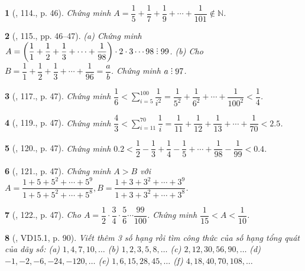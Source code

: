 \documentclass{article}
\newtheorem{baitoan}{}
\DeclareRobustCommand{\divby}{%
	\mathrel{\vbox{\baselineskip.65ex\lineskiplimit0pt\hbox{.}\hbox{.}\hbox{.}}}%
}
\begin{document}
\begin{baitoan}[\cite{Binh_Toan_6_tap_2}, 114., p. 46]
	Chứng minh $A = \dfrac{1}{5} + \dfrac{1}{7} + \dfrac{1}{9} + \cdots + \dfrac{1}{101}\notin\mathbb{N}$.
\end{baitoan}

\begin{baitoan}[\cite{Binh_Toan_6_tap_2}, 115., pp. 46--47]
	(a) Chứng minh $A = \left(\dfrac{1}{1} + \dfrac{1}{2} + \dfrac{1}{3} + \cdots + \dfrac{1}{98}\right)\cdot2\cdot3\cdots98\divby99$. (b) Cho $B = \dfrac{1}{1} + \dfrac{1}{2} + \dfrac{1}{3} + \cdots + \dfrac{1}{96} = \dfrac{a}{b}$. Chứng minh $a\divby97$.
\end{baitoan}

\begin{baitoan}[\cite{Binh_Toan_6_tap_2}, 117., p. 47]
	Chứng minh $\dfrac{1}{6} < \sum_{i=5}^{100} \dfrac{1}{i^2} = \dfrac{1}{5^2} + \dfrac{1}{6^2} + \cdots + \dfrac{1}{100^2} < \dfrac{1}{4}$.
\end{baitoan}

\begin{baitoan}[\cite{Binh_Toan_6_tap_2}, 119., p. 47]
	Chứng minh $\dfrac{4}{3} < \sum_{i=11}^{70} \dfrac{1}{i} = \dfrac{1}{11} + \dfrac{1}{12} + \dfrac{1}{13} + \cdots + \dfrac{1}{70} < 2.5$.
\end{baitoan}

\begin{baitoan}[\cite{Binh_Toan_6_tap_2}, 120., p. 47]
	Chứng minh $0.2 < \dfrac{1}{2} - \dfrac{1}{3} + \dfrac{1}{4} - \dfrac{1}{5} + \cdots + \dfrac{1}{98} - \dfrac{1}{99} < 0.4$.
\end{baitoan}

\begin{baitoan}[\cite{Binh_Toan_6_tap_2}, 121., p. 47]
	Chứng minh $A > B$ với $A = \dfrac{1 + 5 + 5^2 + \cdots + 5^9}{1 + 5 + 5^2 + \cdots + 5^8},B = \dfrac{1 + 3 + 3^2 + \cdots + 3^9}{1 + 3 + 3^2 + \cdots + 3^8}$. 
\end{baitoan}

\begin{baitoan}[\cite{Binh_Toan_6_tap_2}, 122., p. 47]
	Cho $A = \dfrac{1}{2}\cdot\dfrac{3}{4}\cdot\dfrac{5}{6}\cdots\dfrac{99}{100}$. Chứng minh $\dfrac{1}{15} < A < \dfrac{1}{10}$.
\end{baitoan}

\begin{baitoan}[\cite{TLCT_THCS_Toan_6_so_hoc}, VD15.1, p. 90]
	Viết thêm 3 số hạng rồi tìm công thức của số hạng tổng quát của dãy số: (a) $1,4,7,10,\ldots$ (b) $1,2,3,5,8,\ldots$ (c) $2,12,30,56,90,\ldots$ (d) $-1,-2,-6,-24,-120,\ldots$ (e) $1,6,15,28,45,\ldots$ (f) $4,18,40,70,108,\ldots$
\end{baitoan}
\end{document}
